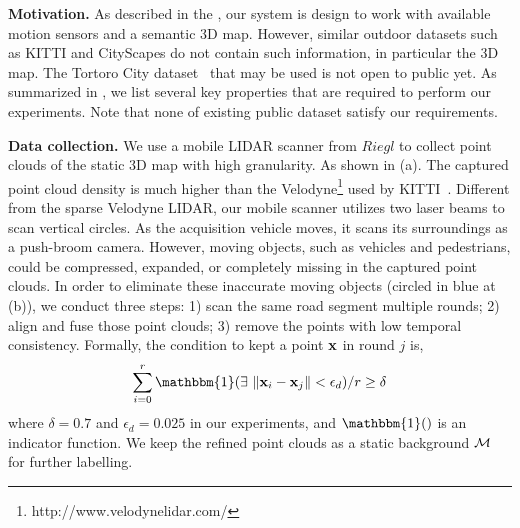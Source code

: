 \textbf{Motivation.}
As described in the , our system is design to work with available motion sensors and a semantic 3D map.
However, similar outdoor datasets such as KITTI and CityScapes do not contain such information, in particular the 3D map. The Tortoro City dataset~\cite{wang2016torontocity} that may be used is not open to public yet. As summarized in , we list several key properties that are required to perform our experiments.
Note that none of existing public dataset satisfy our requirements.

\textbf{Data collection.}
We use a mobile LIDAR scanner from $Riegl$ to collect point clouds of the static 3D map with high granularity. As shown in (a). The captured point cloud density is much higher than the Velodyne\footnote{http://www.velodynelidar.com/} used by KITTI~\cite{geiger2012we}.
Different from the sparse Velodyne LIDAR, our mobile scanner utilizes two laser beams to scan vertical circles. As the acquisition vehicle moves, it scans its surroundings as a push-broom camera. However, moving objects, such as vehicles and pedestrians, could be compressed, expanded, or completely missing in the captured point clouds.
In order to eliminate these inaccurate moving objects (circled in blue at (b)), we conduct three steps:
1) scan the same road segment multiple rounds; 2) align and fuse those point clouds; 3) remove the points with low temporal consistency.
Formally, the condition to kept a point ${\mathbf x}$ in round $j$ is,
{\vspace{-0.5\baselineskip}
\begin{align}
\sum_{i=0}^{r}{\mathbbm{1}(\exists~\|\ve{x}_i - \ve{x}_j\| < \epsilon_d )} / r \geq \delta
\end{align}
}
where $\delta = 0.7$ and $\epsilon_d = 0.025$ in our experiments, and $\mathbbm{1}()$ is an indicator function. 
We keep the refined point clouds as a static background ${\mathcal M}$ for further labelling.


